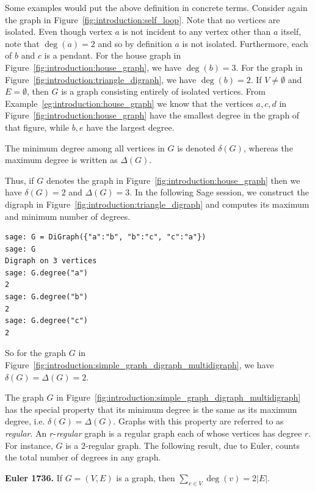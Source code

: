 Some examples would put the above definition in concrete
terms. Consider again the graph in
Figure~\ref{fig:introduction:self_loop}. Note that no vertices are
isolated. Even though vertex $a$ is not incident to any vertex other
than $a$ itself, note that $\deg(a) = 2$ and so by definition $a$ is
not isolated. Furthermore, each of $b$ and $c$ is a pendant. For the
house graph in Figure~\ref{fig:introduction:house_graph}, we have
$\deg(b) = 3$. For the graph in
Figure~\ref{fig:introduction:triangle_digraph}, we have
$\deg(b) = 2$. If $V \neq \emptyset$ and $E = \emptyset$, then
$G$ is a graph consisting entirely of isolated vertices. From
Example~\ref{eg:introduction:house_graph} we know that the vertices
$a, c, d$ in Figure~\ref{fig:introduction:house_graph} have the
smallest degree in the graph of that figure, while $b, e$ have the
largest degree.

The minimum degree among all vertices in $G$ is denoted
$\delta(G)$, whereas the maximum degree is written
as $\Delta(G)$.

Thus, if $G$ denotes the graph in
Figure~\ref{fig:introduction:house_graph} then we have $\delta(G) = 2$
and $\Delta(G) = 3$. In the following Sage session, we construct the
digraph in Figure~\ref{fig:introduction:triangle_digraph} and computes
its maximum and minimum number of degrees.
\index{$\delta$}
\index{$\Delta$}
%
\begin{lstlisting}
sage: G = DiGraph({"a":"b", "b":"c", "c":"a"})
sage: G
Digraph on 3 vertices
sage: G.degree("a")
2
sage: G.degree("b")
2
sage: G.degree("c")
2
\end{lstlisting}
%
So for the graph $G$ in
Figure~\ref{fig:introduction:simple_graph_digraph_multidigraph}, we have
$\delta(G) = \Delta(G) = 2$.

The graph $G$ in
Figure~\ref{fig:introduction:simple_graph_digraph_multidigraph}
has the special property that its minimum degree is the same as its
maximum degree, i.e. $\delta(G) = \Delta(G)$. Graphs with this
property are referred to as \emph{regular}. An $r$-\emph{regular}
graph is a regular graph each of whose vertices has degree $r$. For
instance, $G$ is a $2$-regular graph. The following result, due to
Euler, counts the total number of degrees in any graph.

\begin{theorem}
\label{thm:introduction:degree_sum}
\label{thm:introduction:hand_shaking}
\textbf{Euler 1736.}
If $G = (V, E)$ is a graph, then $\sum_{v \in V} \deg(v) = 2 |E|$.
\end{theorem}

